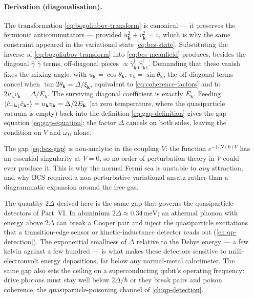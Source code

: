 \paragraph{Derivation (diagonalisation).}
The transformation \cref{eq:bogoliubov-transform} is canonical --- it
preserves the fermionic anticommutators --- provided
$u_{\mathbf k}^2+v_{\mathbf k}^2=1$, which is why the same constraint
appeared in the variational state \cref{eq:bcs-state}. Substituting
the inverse of \cref{eq:bogoliubov-transform} into
\cref{eq:bcs-meanfield} produces, besides the diagonal
$\hat\gamma^\dagger\hat\gamma$ terms, off-diagonal pieces
$\propto\hat\gamma^\dagger_{\mathbf k0}\hat\gamma^\dagger_{\mathbf k1}$.
Demanding that these vanish fixes the mixing angle: with
$u_{\mathbf k}=\cos\theta_{\mathbf k}$, $v_{\mathbf k}=\sin\theta_{\mathbf k}$,
the off-diagonal terms cancel when
$\tan2\theta_{\mathbf k}=\Delta/\xi_{\mathbf k}$, equivalent to
\cref{eq:coherence-factors} and to
$2u_{\mathbf k}v_{\mathbf k}=\Delta/E_{\mathbf k}$. The surviving
diagonal coefficient is exactly $E_{\mathbf k}$. Feeding
$\expval{\hat c_{-\mathbf k\downarrow}\hat c_{\mathbf k\uparrow}}
= u_{\mathbf k}v_{\mathbf k}=\Delta/2E_{\mathbf k}$ (at zero
temperature, where the quasiparticle vacuum is empty) back into the
definition \cref{eq:gap-definition} gives the gap equation
\cref{eq:gap-equation}; the factor $\Delta$ cancels on both sides,
leaving the condition on $V$ and $\omega_D$ alone.

\begin{remark}
The gap \cref{eq:bcs-gap} is non-analytic in the coupling $V$: the
function $e^{-1/N(0)V}$ has an essential singularity at $V=0$, so no
order of perturbation theory in $V$ could ever produce it. This is
why the normal Fermi sea is unstable to \emph{any} attraction, and
why BCS required a non-perturbative variational ansatz rather than a
diagrammatic expansion around the free gas.
\end{remark}

\begin{application}
\label{app:gap-partvi}
The quantity $2\Delta$ derived here is the same gap that governs the
quasiparticle detectors of Part~VI. In aluminium $2\Delta\approx
0.34\,\text{meV}$; an athermal phonon with energy above $2\Delta$ can
break a Cooper pair and inject the quasiparticle excitations that a
transition-edge sensor or kinetic-inductance detector reads out
(\cref{ch:qp-detection}). The exponential smallness of $\Delta$
relative to the Debye energy --- a few kelvin against a few hundred
--- is what makes these detectors sensitive to milli-electronvolt
energy depositions, far below any normal-metal calorimeter. The same
gap also sets the ceiling on a superconducting qubit's operating
frequency: drive photons must stay well below $2\Delta/\hbar$ or they
break pairs and poison coherence, the quasiparticle-poisoning channel
of \cref{ch:qp-detection}.
\end{application}

